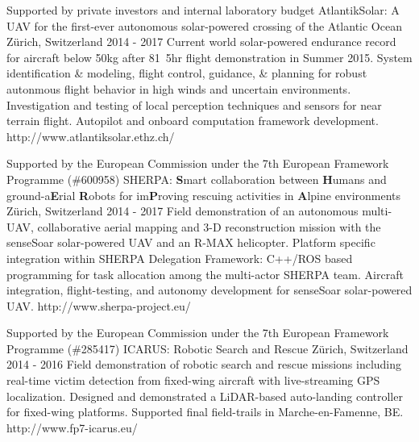 \begin{cventries}
\begin{multicols}{2}
  \cvprojentry
    {Supported by private investors and internal laboratory budget} %
    {AtlantikSolar: A UAV for the first-ever autonomous solar-powered crossing of the Atlantic Ocean} %
    {Z\"{u}rich, Switzerland} %
    {2014 - 2017} %
    {Current world solar-powered endurance record for aircraft below \unit{50}{kg} after \unit{81.5}{hr} flight demonstration in Summer 2015.} %
    {System identification \& modeling, flight control, guidance, \& planning for robust autonmous flight behavior in high winds and uncertain environments. Investigation and testing of local perception techniques and sensors for near terrain flight. Autopilot and onboard computation framework development.} %
	{http://www.atlantiksolar.ethz.ch/}
	
  \cvprojentry
    {Supported by the European Commission under the 7th European Framework Programme (\#600958)} %
    {SHERPA: \textbf{S}mart collaboration between \textbf{H}umans and ground-a\textbf{E}rial \textbf{R}obots for im\textbf{P}roving rescuing activities in \textbf{A}lpine environments} %
    {Z\"{u}rich, Switzerland} %
    {2014 - 2017} %
    {Field demonstration of an autonomous multi-UAV, collaborative aerial mapping and 3-D reconstruction mission with the senseSoar solar-powered UAV and an R-MAX helicopter.} %
    {Platform specific integration within SHERPA Delegation Framework: C++/ROS based programming for task
allocation among the multi-actor SHERPA team. Aircraft integration, flight-testing, and autonomy development for senseSoar solar-powered UAV.} %
	{http://www.sherpa-project.eu/}

  \cvprojentry
    {Supported by the European Commission under the 7th European Framework Programme (\#285417)} %
    {ICARUS: Robotic Search and Rescue} %
    {Z\"{u}rich, Switzerland} %
    {2014 - 2016} %
    {Field demonstration of robotic search and rescue missions including real-time victim detection from fixed-wing aircraft with live-streaming GPS localization.} %
    {Designed and demonstrated a LiDAR-based auto-landing controller for fixed-wing platforms. Supported final field-trails in Marche-en-Famenne, BE.} %
    {http://www.fp7-icarus.eu/}
    

\end{multicols}
\end{cventries}
